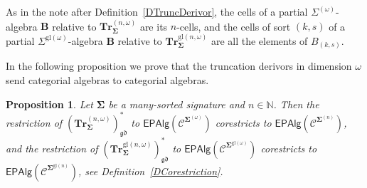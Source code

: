 \documentclass[a4paper, reqno
]{amsart}
\newcommand{\sig}[1]{\mathbf{#1}}             %
\newcommand{\spec}[1]{\boldsymbol{\mathcal{#1}}} %
\newcommand{\gd}{\mathfrak{gd}}              %
\newcommand{\gl}{\mathrm{gl}}                %
\newcommand{\bTr}{\mathbf{Tr}}
\theoremstyle{plain}
\newtheorem{proposition}[theorem]{Proposition}
\theoremstyle{definition}
\begin{document}
As in the note after Definition~\ref{DTruncDerivor}, the cells of a partial $\Sigma^{(\omega)}$-algebra $\mathbf{B}$ relative to $\bTr^{(n,\omega)}_{\sig{\Sigma}}$ are its $n$-cells, and the cells of sort $(k,s)$ of a partial $\Sigma^{\gl(\omega)}$-algebra $\mathbf{B}$ relative to $\bTr^{\gl(n,\omega)}_{\sig{\Sigma}}$ are all the elements of $B_{(k,s)}$.

In the following proposition we prove that the truncation derivors in dimension $\omega$ send categorial algebras to categorial algebras.

\begin{proposition}\label{PTruncOmegaDerivor}
Let $\sig{\Sigma}$ be a many-sorted signature and $n\in\mathbb{N}$.
Then the restriction of $(\bTr^{(n,\omega)}_{\sig{\Sigma}})^{\ast}_{\gd}$ to $\mathsf{EPAlg}(\spec{C}^{\sig{\Sigma}^{(\omega)}})$ corestricts to $\mathsf{EPAlg}(\spec{C}^{\sig{\Sigma}^{(n)}})$, and the restriction of $(\bTr^{\gl(n,\omega)}_{\sig{\Sigma}})^{\ast}_{\gd}$ to $\mathsf{EPAlg}(\spec{C}^{\sig{\Sigma}^{\gl(\omega)}})$ corestricts to $\mathsf{EPAlg}(\spec{C}^{\sig{\Sigma}^{\gl(n)}})$, see Definition~\ref{DCorestriction}.
\end{proposition}
\end{document}
